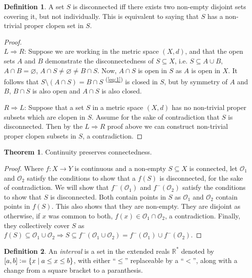 \documentclass{article}
\newcommand{\sref}[1]{\textsuperscript{(\ref{#1})}}
\theoremstyle{definition}
\newtheorem{thm}{Theorem}[subsubsection]
\newtheorem{defn}{Definition}[subsubsection]
\begin{document}
\begin{defn}
	A set $S$ is disconnected iff there exists two non-empty disjoint sets covering it, but not individually. This is equivalent to saying that $S$ has a non-trivial proper clopen set in $S$.
\end{defn}
\begin{proof}
	$ $\\$L\Rightarrow R$:
	Suppose we are working in the metric space $(X,d)$, and that the open sets $A$ and $B$ demonstrate the disconnectedness of $S\subseteq X$, i.e. $S\subseteq A\cup B$, $A\cap B=\varnothing$, $A\cap S\not=\varnothing\not=B\cap S$.
	Now, $A\cap S$ is open in $S$ as $A$ is open in $X$. It follows that $S\setminus (A\cap S)=B\cap S$ \sref{eq:1}\label{ap1}
	is closed in $S$, but by symmetry of $A$ and $B$, $B\cap S$ is also open and $A\cap S$ is also closed.\par

	$R\Rightarrow L$:
	Suppose that a set $S$ in a metric space $(X,d)$ has no non-trivial proper subsets which are clopen in $S$. Assume for the sake of contradiction that $S$ is disconnected. Then by the $L\Rightarrow R$ proof above we can construct non-trivial proper clopen subsets in $S$, a contradiction.
\end{proof}
\begin{thm}
	Continuity preserves connectedness.
\end{thm}
\begin{proof}
	Where $f:X\rightarrow Y$ is continuous and a non-empty $S\subseteq X$ is connected, let $\mathcal{O}_1$ and $\mathcal{O}_2$ satisfy the conditions to show that a $f(S)$ is disconnected, for the sake of contradiction. We will show that $f^-(\mathcal{O}_1)$ and $f^-(\mathcal{O}_2)$ satisfy the conditions to show that $S$ is disconnected.
	Both contain points in $S$ as $\mathcal{O}_1$ and $\mathcal{O}_2$ contain points in $f(S)$. This also shows that they are non-empty. 
	They are disjoint as otherwise, if $x$ was common to both, $f(x)\in \mathcal{O}_1\cap\mathcal{O}_2$, a contradiction.
	Finally, they collectively cover $S$ as $f(S)\subseteq \mathcal{O}_1\cup \mathcal{O}_2\Rightarrow S\subseteq f^-(\mathcal{O}_1\cup \mathcal{O}_2)=f^-(\mathcal{O}_1)\cup f^-(\mathcal{O}_2)$.
\end{proof}
\begin{defn}
	An \emph{interval} is a set in the extended reals $\mathbb{R}^*$ denoted by $[a,b]\vcentcolon=\{x\mid a\leq x\leq b\}$, with either ``$\leq$'' replaceable by a ``$<$'', along with a change from a square bracket to a paranthesis.
\end{defn}
\end{document}
